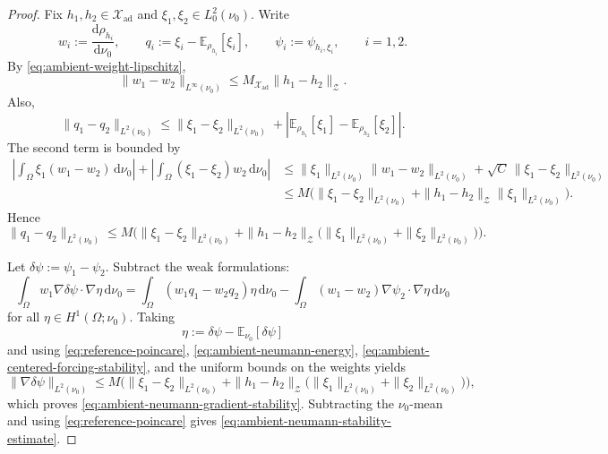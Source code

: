 \documentclass{article}
\theoremstyle{definition}
\renewcommand{\d}{\mathrm{d}}
\begin{document}
\begin{proof}
    Fix \(h_1,h_2\in\mathcal X_{\mathrm{ad}}\) and \(\xi_1,\xi_2\in L^2_0(\nu_0)\). Write
    \[
        w_i:=\frac{\d\rho_{h_i}}{\d\nu_0},
        \qquad
        q_i:=\xi_i-\mathbb E_{\rho_{h_i}}[\xi_i],
        \qquad
        \psi_i:=\psi_{h_i,\xi_i},
        \qquad i=1,2.
    \]
    By \eqref{eq:ambient-weight-lipschitz},
    \[
        \|w_1-w_2\|_{L^\infty(\nu_0)}
        \le
        M_{\mathcal X_{\mathrm{ad}}}\|h_1-h_2\|_{\mathcal Z}.
    \]
    Also,
    \[
        \|q_1-q_2\|_{L^2(\nu_0)}
        \le
        \|\xi_1-\xi_2\|_{L^2(\nu_0)}
        +
        \left|
        \mathbb E_{\rho_{h_1}}[\xi_1]-\mathbb E_{\rho_{h_2}}[\xi_2]
        \right|.
    \]
    The second term is bounded by
    \begin{align*}
        \left|
        \int_\Omega \xi_1(w_1-w_2)\,\d\nu_0
        \right|
        +
        \left|
        \int_\Omega (\xi_1-\xi_2)w_2\,\d\nu_0
        \right|
         & \le
        \|\xi_1\|_{L^2(\nu_0)}\|w_1-w_2\|_{L^2(\nu_0)}
        +
        \sqrt{C}\,\|\xi_1-\xi_2\|_{L^2(\nu_0)} \\
         & \le
        M\Big(
        \|\xi_1-\xi_2\|_{L^2(\nu_0)}
        +
        \|h_1-h_2\|_{\mathcal Z}\|\xi_1\|_{L^2(\nu_0)}
        \Big).
    \end{align*}
    Hence
    \begin{equation}
        \label{eq:ambient-centered-forcing-stability}
        \|q_1-q_2\|_{L^2(\nu_0)}
        \le
        M\Big(
        \|\xi_1-\xi_2\|_{L^2(\nu_0)}
        +
        \|h_1-h_2\|_{\mathcal Z}
        \bigl(\|\xi_1\|_{L^2(\nu_0)}+\|\xi_2\|_{L^2(\nu_0)}\bigr)
        \Big).
    \end{equation}

    Let \(\delta\psi:=\psi_1-\psi_2\). Subtract the weak formulations:
    \[
        \int_\Omega w_1\nabla\delta\psi\cdot\nabla\eta\,\d\nu_0
        =
        \int_\Omega (w_1q_1-w_2q_2)\eta\,\d\nu_0
        -
        \int_\Omega (w_1-w_2)\nabla\psi_2\cdot\nabla\eta\,\d\nu_0
    \]
    for all \(\eta\in H^1(\Omega;\nu_0)\). Taking
    \[
        \eta:=\delta\psi-\mathbb E_{\nu_0}[\delta\psi]
    \]
    and using \eqref{eq:reference-poincare}, \eqref{eq:ambient-neumann-energy},
    \eqref{eq:ambient-centered-forcing-stability}, and the uniform bounds on the weights yields
    \[
        \|\nabla\delta\psi\|_{L^2(\nu_0)}
        \le
        M\Big(
        \|\xi_1-\xi_2\|_{L^2(\nu_0)}
        +
        \|h_1-h_2\|_{\mathcal Z}
        \bigl(\|\xi_1\|_{L^2(\nu_0)}+\|\xi_2\|_{L^2(\nu_0)}\bigr)
        \Big),
    \]
    which proves \eqref{eq:ambient-neumann-gradient-stability}. Subtracting the
    \(\nu_0\)-mean and using \eqref{eq:reference-poincare} gives
    \eqref{eq:ambient-neumann-stability-estimate}.
\end{proof}
\end{document}

